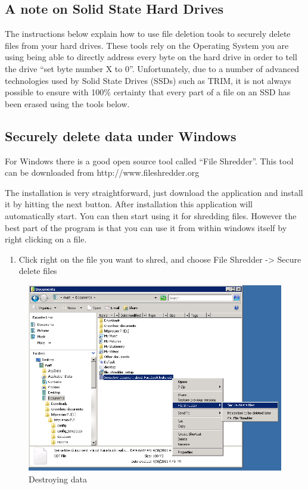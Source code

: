 \subsection{A note on Solid State Hard Drives}

The instructions below explain how to use file deletion tools to
securely delete files from your hard drives. These tools rely on the
Operating System you are using being able to directly address every byte
on the hard drive in order to tell the drive ``set byte number X to 0''.
Unfortunately, due to a number of advanced technologies used by Solid
State Drives (SSDs) such as TRIM, it is not always possible to ensure
with 100\% certainty that every part of a file on an SSD has been erased
using the tools below.

\subsection{Securely delete data under Windows}

For Windows there is a good open source tool called ``File Shredder''.
This tool can be downloaded from http://www.fileshredder.org

The installation is very straightforward, just download the application
and install it by hitting the next button. After installation this
application will automatically start. You can then start using it for
shredding files. However the best part of the program is that you can
use it from within windows itself by right clicking on a file.

\begin{enumerate}[1.]
\item
  Click right on the file you want to shred, and choose File Shredder
  -\textgreater{} Secure delete files
\end{enumerate}
\begin{figure}[htbp]
\centering
\includegraphics{destroy_data_001.png}
\caption{Destroying data}
\end{figure}

